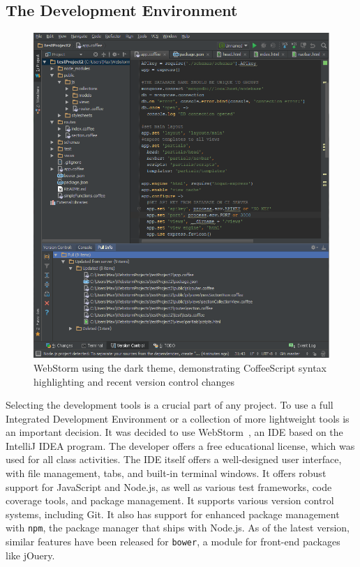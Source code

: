 \documentclass[12pt]{article}
\newcommand{\code}[1]{{\texttt {#1}}}
\begin{document}
\subsection{The Development Environment}\label{sec:IDE}
\begin{figure}[h!]
\includegraphics[width=\linewidth]{img/webstorm.png}
\caption{WebStorm using the dark theme, demonstrating CoffeeScript syntax highlighting and recent version control changes}
\end{figure}
Selecting the development tools is a crucial part of any project. To use a full Integrated Development Environment or a collection of more lightweight tools is an important decision. It was decided to use WebStorm~\cite{WebStorm}, an IDE based on the IntelliJ IDEA program. The developer offers a free educational license, which was used for all class activities. The IDE itself offers a well-designed user interface, with file management, tabs, and built-in terminal windows. It offers robust support for JavaScript and Node.js, as well as various test frameworks, code coverage tools, and package management. It supports various version control systems, including Git. It also has support for enhanced package management with \code{npm}, the package manager that ships with Node.js. As of the latest version, similar features have been released for \code{bower}, a module for front-end packages like jOuery.
\end{document}
